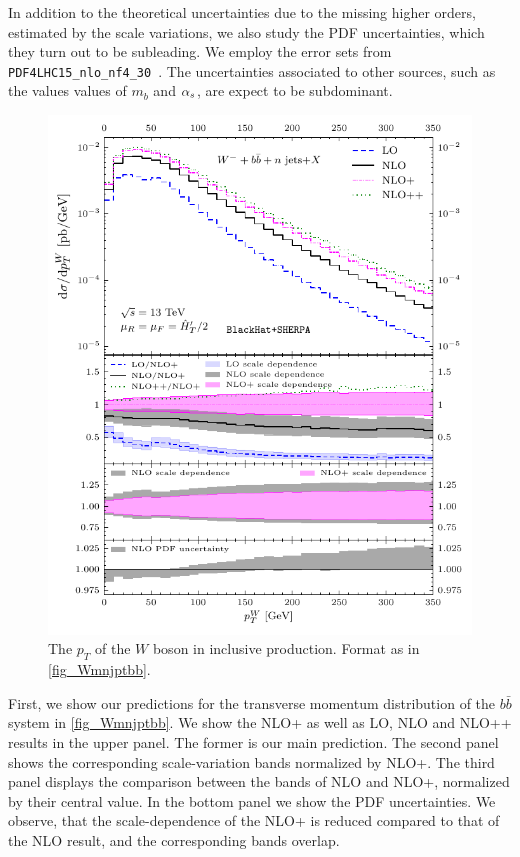 In addition to the theoretical uncertainties due to the missing higher orders, estimated
by the scale variations, we also study the PDF uncertainties, which 
they turn out to be subleading. 
We employ the error sets from \texttt{PDF4LHC15\_nlo\_nf4\_30}~\cite{Butterworth:2015oua}. 
The uncertainties associated to other sources, such as the values values of $m_b$ and $\alpha_s$,
are expect to be subdominant.

\begin{figure}[ht]
  \centering
  \includegraphics[clip,scale=1]{plots/excl_ptw_v4}
  \caption{The $p_T$ of the $W$ boson in inclusive \Wbbm{} production. Format as in \cref{fig_Wmnjptbb}.}
  \label{fig_Wmnjptw}
\end{figure}

First, we show our predictions  for the transverse momentum distribution of
the $b\bar b$ system in \cref{fig_Wmnjptbb}.
We show the NLO+ as well as LO, NLO and NLO++ results in the upper panel.
The former is our main prediction.
The second panel shows the corresponding scale-variation bands normalized by NLO+.
The third panel displays the comparison between the bands of NLO and NLO+, normalized by their central value.
In the bottom panel we show the PDF uncertainties. 
We observe, that the scale-dependence of the NLO+ is reduced compared to that of the NLO result,
and the corresponding bands overlap.
 
